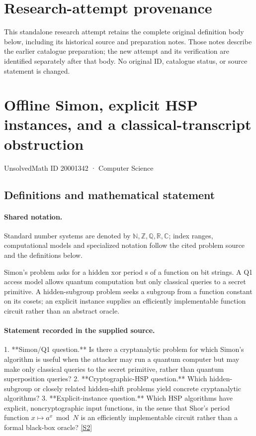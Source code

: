 \documentclass[11pt]{article}
\begin{document}
\section*{Research-attempt provenance}
This standalone research attempt retains the complete original definition body below,
including its historical source and preparation notes. Those notes describe the
earlier catalogue preparation; the new attempt and its verification are identified
separately after that body. No original ID, catalogue status, or source statement is changed.

\section{Offline Simon, explicit HSP instances, and a classical-transcript obstruction}\label{20001342}
{\small UnsolvedMath ID 20001342 · Computer Science}
\subsection{Definitions and mathematical statement}

\paragraph{Shared notation.}Standard number systems are denoted by $\mathbb N,\mathbb Z,\mathbb Q,\mathbb R,\mathbb C$; index ranges, computational models and specialized notation follow the cited problem source and the definitions below.


Simon's problem asks for a hidden xor period s of a function on bit strings. A Q1 access model allows quantum computation but only classical queries to a secret primitive. A hidden-subgroup problem seeks a subgroup from a function constant on its cosets; an explicit instance supplies an efficiently implementable function circuit rather than an abstract oracle.
\paragraph{Statement recorded in the supplied source.}
1. **Simon/Q1 question.** Is there a cryptanalytic problem for which Simon's algorithm is useful when the attacker may run a quantum computer but may make only classical queries to the secret primitive, rather than quantum superposition queries?
2. **Cryptographic-HSP question.** Which hidden-subgroup or closely related hidden-shift problems yield concrete cryptanalytic algorithms?
3. **Explicit-instance question.** Which HSP algorithms have explicit, noncryptographic input functions, in the sense that Shor's period function \(x\mapsto a^x\bmod N\) is an efficiently implementable circuit rather than a formal black-box oracle? \href{http://aimpl.org/quantumalg/6/}{[S2]}
\end{document}
